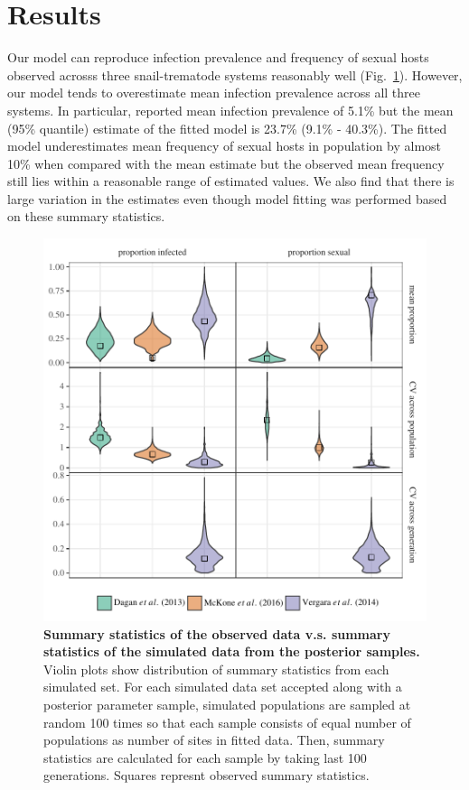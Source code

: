 \documentclass{article}\usepackage[]{graphicx}\usepackage[]{color}
\newcommand{\fref}[1]{Fig.~\ref{fig:#1}}
\begin{document}
\section{Results}

Our model can reproduce infection prevalence and frequency of sexual hosts observed acrosss three snail-trematode systems reasonably well (\fref{smcsumm}).
However, our model tends to overestimate mean infection prevalence across all three systems.
In particular, \cite{mckone2016fine} reported mean infection prevalence of 5.1\% but the mean (95\% quantile) estimate of the fitted model is 23.7\% (9.1\% - 40.3\%).
The fitted model underestimates mean frequency of sexual hosts in \cite{vergara2014infection} population by almost 10\% when compared with the mean estimate but the observed mean frequency still lies within a reasonable range of estimated values.
We also find that there is large variation in the estimates even though model fitting was performed based on these summary statistics.

\begin{figure}[!htp]
\includegraphics[width=\textwidth]{../fig/smc_summary.pdf}
\caption{{\bf Summary statistics of the observed data v.s. summary statistics of the simulated data from the posterior samples.}
Violin plots show distribution of summary statistics from each simulated set. For each simulated data set accepted along with a posterior parameter sample, simulated populations are sampled at random 100 times so that each sample consists of equal number of populations as number of sites in fitted data. Then, summary statistics are calculated for each sample by taking last 100 generations. Squares represnt observed summary statistics.
}
\label{fig:smcsumm}
\end{figure}
\end{document}
